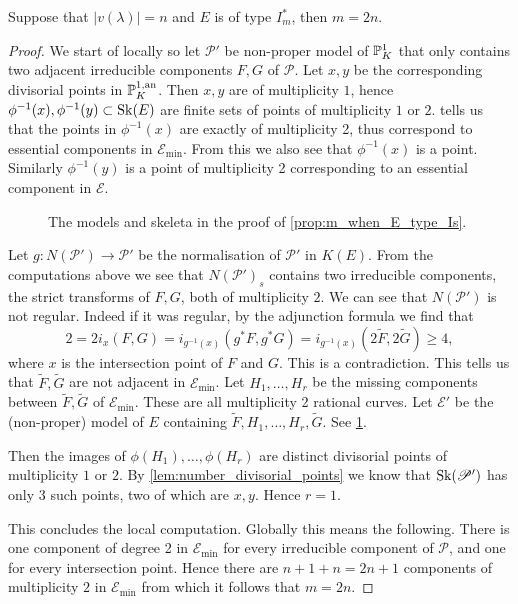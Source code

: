 \begin{proposition}\label{prop:m_when_E_type_Is}
	Suppose that $|v(\lambda)| = n$ and $E$ is of type $I_m^*$, then $m = 2n$. 
\end{proposition}
\begin{proof}
	We start of locally so let $\mathscr P'$ be non-proper model of $\mathbb{P}^{1}_K$ that only contains two adjacent irreducible components $F, G$ of  $\mathscr P$.
	Let $x, y $ be the corresponding divisorial points in $\mathbb{P}^{1, \text{an}}_K$. 
	Then $x, y$ are of multiplicity $1$, hence $\phi^{-1}(x), \phi^{-1}(y) \subset  \sk(E)$ are finite sets of points of multiplicity $1$ or $2$. 
	 tells us that the points in $\phi^{-1}(x)$ are exactly of multiplicity 2, thus correspond to essential components in $\mathscr E_\text{min} $.
	From this we also see that $\phi^{-1}(x)$ is a point. 
	Similarly $\phi^{-1}(y)$ is a point of multiplicity 2 corresponding to an essential component in $\mathscr E$. 

\begin{figure}[ht]
    \centering
    \caption{The models and skeleta in the proof of \cref{prop:m_when_E_type_Is}.}
    \label{fig:models_proof_is}
\end{figure}

	Let $g: N(\mathscr P') \to \mathscr P'$ be the normalisation of $\mathscr P'$ in $K(E)$.
	From the computations above we see that $N(\mathscr P')_s$ contains two irreducible components, the strict transforms of $F, G$, both of multiplicity $2$. 
	We can see that $N(\mathscr P')$ is not regular. 
	Indeed if it was regular, by the adjunction formula we find that \[
		2 = 2i_x(F, G) =  i_{g^{-1}(x)}(g^* F, g^* G) =  i_{g^{-1}(x)}(2 \tilde F,   2 \tilde G)  \ge 4
	,\] 
	where $x$ is the intersection point of $F$ and $G$. 
	This is a contradiction. 
	This tells us that $\tilde F, \tilde G$ are not adjacent in $\mathscr E_\text{min} $. 
	Let $H_1, \ldots, H_r$ be the missing components between $\tilde F, \tilde G$ of $\mathscr E_\text{min} $. 
	These are all multiplicity 2 rational curves. 
	Let $\mathscr E'$ be the (non-proper) model of $E$ containing $\tilde F, H_1, \ldots, H_r, \tilde G$. See \cref{fig:models_proof_is}.
	
Then the images of $\phi(H_1), \ldots, \phi(H_r)$ are distinct divisorial points of multiplicity $1$ or $2$.
By \cref{lem:number_divisorial_points} we know that $\operatorname{Sk}(\mathscr P')$ has only 3 such points, two of which are $x, y$. 
Hence $r = 1$. 

This concludes the local computation. Globally this means the following. 
There is one component of degree 2 in $\mathscr E_\text{min} $ for every irreducible component of $\mathscr P$, and one for every intersection point. 
Hence there are $n + 1 + n = 2n + 1$ components of multiplicity $2$ in $\mathscr E_\text{min} $ from which it follows that $m = 2n$.  
\end{proof}


